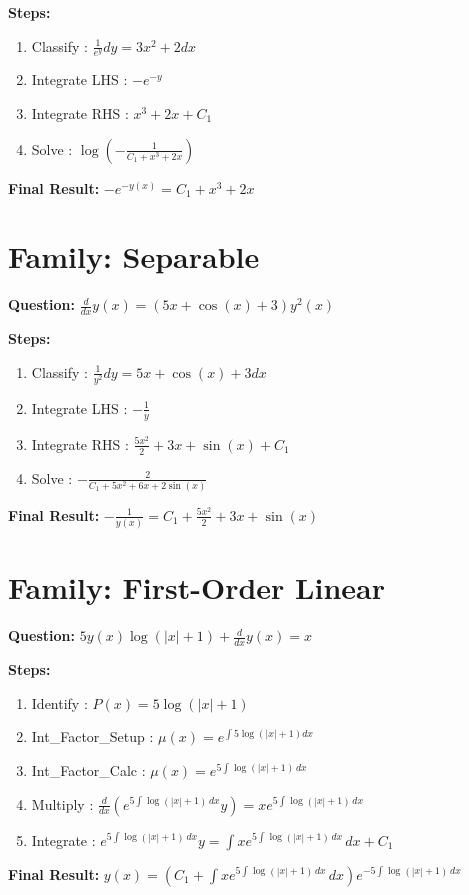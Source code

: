 \documentclass{article}
\begin{document}
\textbf{Steps:}
\begin{enumerate}
\item Classify :  $\frac{1}{e^{y}} dy = 3 x^{2} + 2 dx$
\item Integrate LHS :  $- e^{- y}$
\item Integrate RHS :  $x^{3} + 2 x + C_1$
\item Solve :  $\log{\left(- \frac{1}{C_{1} + x^{3} + 2 x} \right)}$
\end{enumerate}
\textbf{Final Result:} $- e^{- y{\left(x \right)}} = C_{1} + x^{3} + 2 x$

\section*{Family: Separable}
\textbf{Question:} $\frac{d}{d x} y{\left(x \right)} = \left(5 x + \cos{\left(x \right)} + 3\right) y^{2}{\left(x \right)}$

\textbf{Steps:}
\begin{enumerate}
\item Classify :  $\frac{1}{y^{2}} dy = 5 x + \cos{\left(x \right)} + 3 dx$
\item Integrate LHS :  $- \frac{1}{y}$
\item Integrate RHS :  $\frac{5 x^{2}}{2} + 3 x + \sin{\left(x \right)} + C_1$
\item Solve :  $- \frac{2}{C_{1} + 5 x^{2} + 6 x + 2 \sin{\left(x \right)}}$
\end{enumerate}
\textbf{Final Result:} $- \frac{1}{y{\left(x \right)}} = C_{1} + \frac{5 x^{2}}{2} + 3 x + \sin{\left(x \right)}$

\section*{Family: First-Order Linear}
\textbf{Question:} $5 y{\left(x \right)} \log{\left(\left|{x}\right| + 1 \right)} + \frac{d}{d x} y{\left(x \right)} = x$

\textbf{Steps:}
\begin{enumerate}
\item Identify :  $P(x) = 5 \log{\left(\left|{x}\right| + 1 \right)}$
\item Int_Factor_Setup :  $\mu(x) = e^{\int 5 \log{\left(\left|{x}\right| + 1 \right)} dx}$
\item Int_Factor_Calc :  $\mu(x) = e^{5 \int \log{\left(\left|{x}\right| + 1 \right)}\, dx}$
\item Multiply :  $\frac{d}{dx}(e^{5 \int \log{\left(\left|{x}\right| + 1 \right)}\, dx}y) = x e^{5 \int \log{\left(\left|{x}\right| + 1 \right)}\, dx}$
\item Integrate :  $e^{5 \int \log{\left(\left|{x}\right| + 1 \right)}\, dx}y = \int x e^{5 \int \log{\left(\left|{x}\right| + 1 \right)}\, dx}\, dx + C_1$
\end{enumerate}
\textbf{Final Result:} $y{\left(x \right)} = \left(C_{1} + \int x e^{5 \int \log{\left(\left|{x}\right| + 1 \right)}\, dx}\, dx\right) e^{- 5 \int \log{\left(\left|{x}\right| + 1 \right)}\, dx}$
\end{document}
